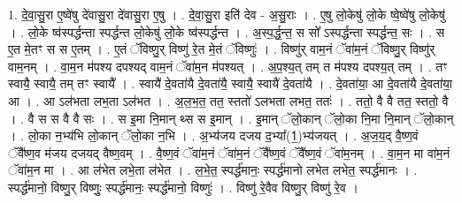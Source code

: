 \documentclass[17pt]{extarticle}
\begin{document}
1. दे॒वा॒सु॒रा ए॒ष्वे॑षु दे॑वासु॒रा दे॑वासु॒रा ए॒षु । . दे॒वा॒सु॒रा इति॑ देव - अ॒सु॒राः । . ए॒षु लो॒केषु॑ लो॒के ष्वे॒ष्वे॑षु लो॒केषु॑ । . लो॒के ष्व॑स्पर्द्धन्ता स्पर्द्धन्त लो॒केषु॑ लो॒के ष्व॑स्पर्द्धन्त । . अ॒स्प॒र्द्ध॒न्त॒ स सो᳚ ऽस्पर्द्धन्ता स्पर्द्धन्त॒ सः । . स ए॒त मे॒तꣳ स स ए॒तम् । . ए॒तं ॅविष्णु॒र् विष्णु॑ रे॒त मे॒तं ॅविष्णुः॑ । . विष्णु॑र् वाम॒नं ॅवा॑म॒नं ॅविष्णु॒र् विष्णु॑र् वाम॒नम् । . वा॒म॒न म॑पश्य दपश्यद् वाम॒नं ॅवा॑म॒न म॑पश्यत् । . अ॒प॒श्य॒त् तम् त म॑पश्य दपश्य॒त् तम् । . तꣳ स्वायै॒ स्वायै॒ तम् तꣳ स्वायै᳚ । . स्वायै॑ दे॒वता॑यै दे॒वता॑यै॒ स्वायै॒ स्वायै॑ दे॒वता॑यै । . दे॒वता॑या॒ आ दे॒वता॑यै दे॒वता॑या॒ आ । . आ ऽल॑भता लभ॒ता ऽल॑भत । . अ॒ल॒भ॒त॒ तत॒ स्ततो॑ ऽलभता लभत॒ ततः॑ । . ततो॒ वै वै तत॒ स्ततो॒ वै । . वै स स वै वै सः । . स इ॒मा नि॒मान् थ्स स इ॒मान् । . इ॒मान् ॅलो॒कान् ॅलो॒का नि॒मा नि॒मान् ॅलो॒कान् । . लो॒का न॒भ्य॑भि लो॒कान् ॅलो॒का न॒भि । . अ॒भ्य॑जय दजय द॒भ्या᳚(1॒)भ्य॑जयत् । . अ॒ज॒य॒द् वै॒ष्ण॒वं ॅवै᳚ष्ण॒व म॑जय दजयद् वैष्ण॒वम् । . वै॒ष्ण॒वं ॅवा॑म॒नं ॅवा॑म॒नं ॅवै᳚ष्ण॒वं ॅवै᳚ष्ण॒वं ॅवा॑म॒नम् । . वा॒म॒न मा वा॑म॒नं ॅवा॑म॒न मा । . आ ल॑भेत लभे॒ता ल॑भेत । . ल॒भे॒त॒ स्पर्द्ध॑मानः॒ स्पर्द्ध॑मानो लभेत लभेत॒ स्पर्द्ध॑मानः । . स्पर्द्ध॑मानो॒ विष्णु॒र् विष्णुः॒ स्पर्द्ध॑मानः॒ स्पर्द्ध॑मानो॒ विष्णुः॑ । . विष्णु॑ रे॒वैव विष्णु॒र् विष्णु॑ रे॒व । \newline
\end{document}
